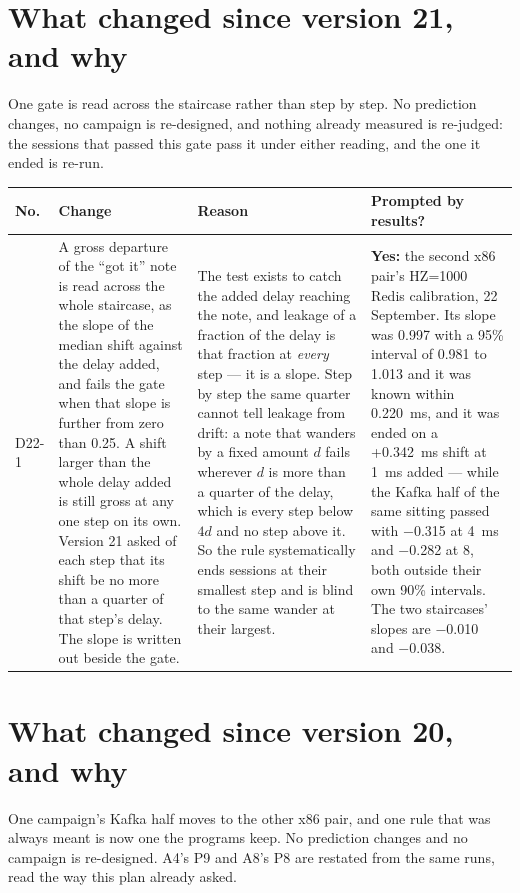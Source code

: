\documentclass[11pt]{article}
\begin{document}
\section*{What changed since version 21, and why}
One gate is read across the staircase rather than step by step. No prediction changes, no
campaign is re-designed, and nothing already measured is re-judged: the sessions that passed this
gate pass it under either reading, and the one it ended is re-run.

{\small
\begin{longtable}{@{}p{1.1cm} >{\raggedright\arraybackslash}p{6.1cm} >{\raggedright\arraybackslash}p{6.0cm} >{\raggedright\arraybackslash}p{2.2cm}@{}}
\toprule
\textbf{No.} & \textbf{Change} & \textbf{Reason} & \textbf{Prompted by results?} \\
\midrule
\endhead
D22-1 & A gross departure of the ``got it'' note is read across the whole staircase, as the slope
of the median shift against the delay added, and fails the gate when that slope is further from
zero than 0.25. A shift larger than the whole delay added is still gross at any one step on its
own. Version 21 asked of each step that its shift be no more than a quarter of that step's delay.
The slope is written out beside the gate. & The test exists to catch the added delay reaching the
note, and leakage of a fraction of the delay is that fraction at \emph{every} step --- it is a
slope. Step by step the same quarter cannot tell leakage from drift: a note that wanders by a
fixed amount $d$ fails wherever $d$ is more than a quarter of the delay, which is every step below
$4d$ and no step above it. So the rule systematically ends sessions at their smallest step and is
blind to the same wander at their largest. & \textbf{Yes:} the second x86 pair's HZ=1000 Redis
calibration, 22 September. Its slope was 0.997 with a 95\% interval of 0.981 to 1.013 and it was
known within 0.220~ms, and it was ended on a +0.342~ms shift at 1~ms added --- while the Kafka
half of the same sitting passed with $-$0.315 at 4~ms and $-$0.282 at 8, both outside their own
90\% intervals. The two staircases' slopes are $-$0.010 and $-$0.038. \\
\bottomrule
\end{longtable}}

\section*{What changed since version 20, and why}
One campaign's Kafka half moves to the other x86 pair, and one rule that was always meant is now
one the programs keep. No prediction changes and no campaign is re-designed. A4's P9 and A8's P8
are restated from the same runs, read the way this plan already asked.
\end{document}
